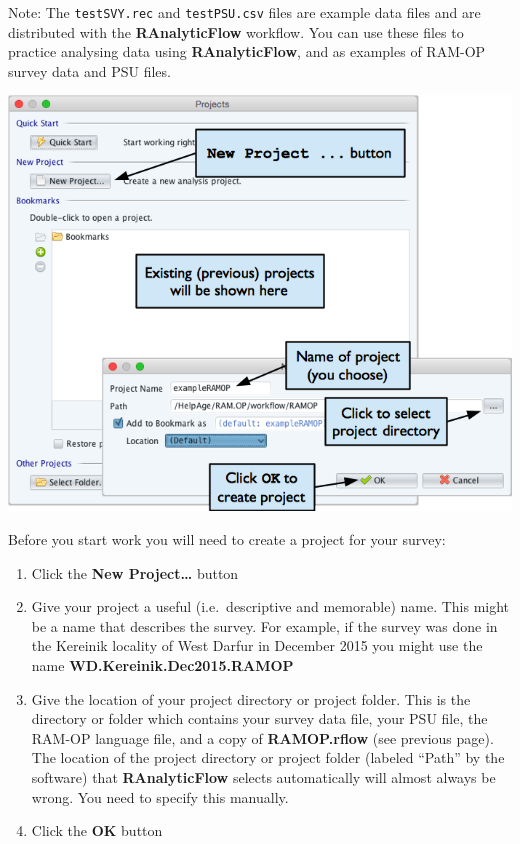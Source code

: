 \documentclass[12pt,a4paper]{book}
\theoremstyle{definition}
\theoremstyle{definition}
\theoremstyle{definition}
\theoremstyle{remark}
\begin{document}
Note: The \texttt{testSVY.rec} and \texttt{testPSU.csv} files are
example data files and are distributed with the \textbf{RAnalyticFlow}
workflow. You can use these files to practice analysing data using
\textbf{RAnalyticFlow}, and as examples of RAM-OP survey data and PSU
files.

\begin{center}\includegraphics{figures/openProjectRAF} \end{center}

Before you start work you will need to create a project for your survey:

\begin{enumerate}
\def\labelenumi{\arabic{enumi}.}
\item
  Click the \textbf{New Project\ldots{}} button
\item
  Give your project a useful (i.e.~descriptive and memorable) name. This
  might be a name that describes the survey. For example, if the survey
  was done in the Kereinik locality of West Darfur in December 2015 you
  might use the name \textbf{WD.Kereinik.Dec2015.RAMOP}
\item
  Give the location of your project directory or project folder. This is
  the directory or folder which contains your survey data file, your PSU
  file, the RAM-OP language file, and a copy of \textbf{RAMOP.rflow}
  (see previous page). The location of the project directory or project
  folder (labeled ``Path'' by the software) that \textbf{RAnalyticFlow}
  selects automatically will almost always be wrong. You need to specify
  this manually.
\item
  Click the \textbf{OK} button
\end{enumerate}
\end{document}
